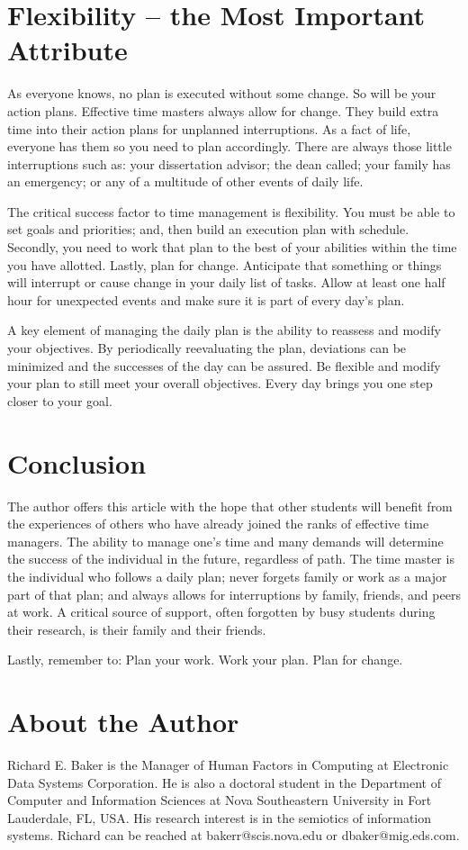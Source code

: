 \documentclass[twocolumn]{article}
\begin{document}
\section*{Flexibility – the Most Important Attribute}
\noindent
As everyone knows, no plan is executed without some change. So will be your
action plans. Effective time masters always allow for change. They build extra
time into their action plans for unplanned interruptions. As a fact of life,
everyone has them so you need to plan accordingly. There are always those little
interruptions such as: your dissertation advisor; the dean called; your family
has an emergency; or any of a multitude of other events of daily life.

The critical success factor to time management is flexibility. You must be able
to set goals and priorities; and, then build an execution plan with schedule.
Secondly, you need to work that plan to the best of your abilities within the
time you have allotted. Lastly, plan for change. Anticipate that something or
things will interrupt or cause change in your daily list of tasks. Allow at
least one half hour for unexpected events and make sure it is part of every
day’s plan.

A key element of managing the daily plan is the ability to reassess and modify
your objectives. By periodically reevaluating the plan, deviations can be
minimized and the successes of the day can be assured. Be flexible and modify
your plan to still meet your overall objectives. Every day brings you one step
closer to your goal.

\section*{Conclusion}
\noindent
The author offers this article with the hope that other students will benefit
from the experiences of others who have already joined the ranks of effective
time managers. The ability to manage one's time and many demands will determine
the success of the individual in the future, regardless of path. The time master
is the individual who follows a daily plan; never forgets family or work as a
major part of that plan; and always allows for interruptions by family, friends,
and peers at work. A critical source of support, often forgotten by busy
students during their research, is their family and their friends.

Lastly, remember to: Plan your work. Work your plan. Plan for change.

\section*{About the Author}
\noindent
Richard E. Baker is the Manager of Human Factors in Computing at Electronic Data
Systems Corporation. He is also a doctoral student in the Department of Computer
and Information Sciences at Nova Southeastern University in Fort Lauderdale,
FL, USA. His research interest is in the semiotics of information systems.
Richard can be reached at bakerr@scis.nova.edu or dbaker@mig.eds.com.
\end{document}
